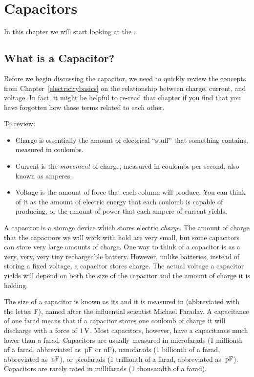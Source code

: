 \chapter{Capacitors}
\label{Capacitors}

In this chapter we will start looking at the . 

\section{What is a Capacitor?}

Before we begin discussing the capacitor, we need to quickly review the concepts from Chapter~\ref{electricitybasics} on the relationship between charge, current, and voltage.
In fact, it might be helpful to re-read that chapter if you find that you have forgotten how those terms related to each other.

To review:

\begin{itemize}
\item Charge is essentially the amount of electrical ``stuff'' that something contains, measured in coulombs.
\item Current is the \emph{movement} of charge, measured in coulombs per second, also known as amperes.
\item Voltage is the amount of force that each column will produce.  You can think of it as the amount of electric energy that each coulomb is capable of producing, or the amount of power that each ampere of current yields.  
\end{itemize}

A capacitor is a storage device which stores electric \emph{charge}.  
The amount of charge that the capacitors we will work with hold are very small, but some capacitors can store very large amounts of charge.
One way to think of a capacitor is as a very, very, very tiny rechargeable battery.
However, unlike batteries, instead of storing a fixed voltage, a capacitor stores charge.
The actual voltage a capacitor yields will depend on both the size of the capacitor and the amount of charge it is holding.

The size of a capacitor is known as its  and it is measured in  (abbreviated with the letter F), named after the influential scientist Michael Faraday.
A capacitance of one farad means that if a capacitor stores one coulomb of charge it will discharge with a force of $1\,\si{\volt}$.
Most capacitors, however, have a capacitance much lower than a farad.
Capacitors are usually measured in microfarads (1 millionth of a farad, abbreviated as $\,\si{\micro\farad}$ or uF), nanofarads (1 billionth of a farad, abbreviated as $\,\si{\nano\farad}$), or picofarads (1 trillionth of a farad, abbreviated as $\mypf$).  
Capacitors are rarely rated in millifarads (1 thousandth of a farad).

